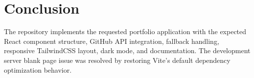 \documentclass[12pt,a4paper]{article}
\begin{document}
\section{Conclusion}

The repository implements the requested portfolio application with the expected
React component structure, GitHub API integration, fallback handling, responsive
TailwindCSS layout, dark mode, and documentation. The development server blank
page issue was resolved by restoring Vite's default dependency optimization
behavior.
\end{document}
